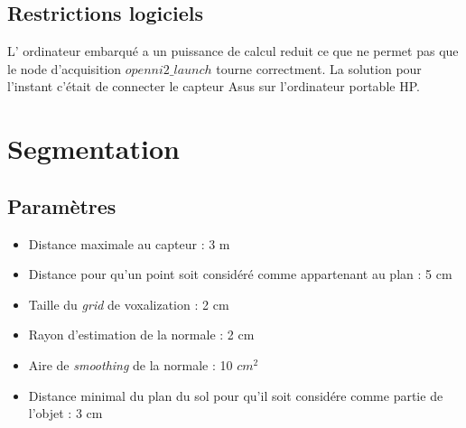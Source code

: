 \begin{figure}[H]
\end{figure}

\begin{figure}[H]
\end{figure}

\begin{figure}[H]
\end{figure}


\subsection{Restrictions logiciels}
L' ordinateur embarqué a un puissance de calcul reduit ce que ne permet pas que le node d'acquisition \(openni2\_launch\) tourne correctment. La solution pour l'instant c'était de connecter le capteur Asus sur l'ordinateur portable HP.

\section{ Segmentation }

\subsection{ Paramètres }

\begin{itemize}
\item Distance maximale au capteur : 3 m
\item Distance pour qu'un point soit considéré comme appartenant au plan : 5 cm
\item Taille du \textit{grid} de voxalization : 2 cm
\item Rayon d'estimation de la normale : 2 cm
\item Aire de \textit{smoothing} de la normale : 10 $cm^2$
\item Distance minimal du plan du sol pour qu'il soit considére comme partie de l'objet : 3 cm
\end{itemize}

